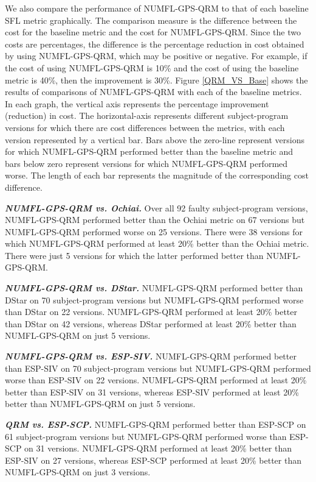 We also compare the performance of NUMFL-GPS-QRM to that of each baseline SFL metric graphically. The comparison measure is the difference between the cost for the baseline metric and the cost for NUMFL-GPS-QRM.  Since the two costs are percentages, the difference is the percentage reduction in cost obtained by using NUMFL-GPS-QRM, which may be positive or negative.  For example, if the cost of using NUMFL-GPS-QRM is 10\% and the cost of using the baseline metric is 40\%, then the improvement is 30\%.  Figure \ref{QRM_VS_Base} shows the results of comparisons of NUMFL-GPS-QRM with each of the baseline metrics.  In each graph, the vertical axis represents the percentage improvement (reduction) in cost. The horizontal-axis represents different subject-program versions for which there are cost differences between the metrics, with each version represented by a vertical bar.   Bars above the zero-line represent versions for which NUMFL-GPS-QRM performed better than the baseline metric and bars below zero represent versions for which NUMFL-GPS-QRM performed worse.  The length of each bar represents the magnitude of the corresponding cost difference.

\textit{\textbf{ NUMFL-GPS-QRM vs. Ochiai.}}  Over all 92 faulty subject-program versions, NUMFL-GPS-QRM performed better than the Ochiai metric on 67 versions but NUMFL-GPS-QRM performed worse on 25 versions.  There were 38 versions for which NUMFL-GPS-QRM performed at least 20\% better than the Ochiai metric.  There were just 5 versions for which the latter performed better than NUMFL-GPS-QRM.

\textit{\textbf{ NUMFL-GPS-QRM vs. DStar.}}  NUMFL-GPS-QRM performed better than DStar on 70 subject-program versions but NUMFL-GPS-QRM performed worse than DStar on 22 versions.  NUMFL-GPS-QRM performed at least 20\% better than DStar on 42 versions, whereas DStar performed at least 20\% better than NUMFL-GPS-QRM on just 5 versions.

\textit{\textbf{ NUMFL-GPS-QRM vs. ESP-SIV.}} NUMFL-GPS-QRM performed better than ESP-SIV on 70 subject-program versions but NUMFL-GPS-QRM performed worse than ESP-SIV on 22 versions.  NUMFL-GPS-QRM performed at least 20\% better than ESP-SIV on 31 versions, whereas ESP-SIV performed at least 20\% better than NUMFL-GPS-QRM on just 5 versions.

\textit{\textbf{ QRM vs. ESP-SCP.}}  NUMFL-GPS-QRM performed better than ESP-SCP on 61 subject-program versions but NUMFL-GPS-QRM performed worse than ESP-SCP on 31 versions.  NUMFL-GPS-QRM performed at least 20\% better than ESP-SIV on 27 versions, whereas ESP-SCP performed at least 20\% better than NUMFL-GPS-QRM on just 3 versions.

